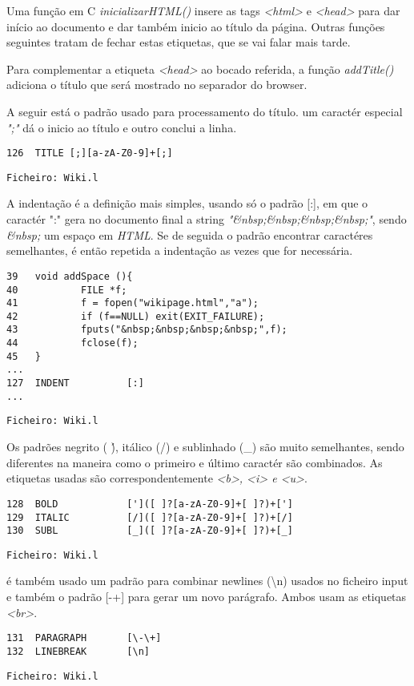\documentclass[11pt,a4paper]{report}
\begin{document}
Uma função em C \emph{inicializarHTML()} insere as tags \emph{<html>} e \emph{<head>} para dar início ao documento e dar também inicio ao título da página. Outras funções seguintes tratam de fechar estas etiquetas, que se vai falar mais tarde.

Para complementar a etiqueta \emph{<head>} ao bocado referida, a função \emph{addTitle()} adiciona o título que será mostrado no separador do browser.

A seguir está o padrão usado para processamento do título. um caractér especial \emph{";"} dá o inicio ao título e outro conclui a linha.


\begin{verbatim}
126  TITLE [;][a-zA-Z0-9]+[;]
\end{verbatim}
\begin{flushright}
\texttt{Ficheiro: Wiki.l}
\end{flushright}


A indentação é a definição mais simples, usando só o padrão [:], em que o caractér ":" gera no documento final a string \emph{"\&nbsp;\&nbsp;\&nbsp;\&nbsp;"}, sendo \emph{\&nbsp;} um espaço em \emph{HTML}. Se de seguida o padrão encontrar caractéres semelhantes, é então repetida a indentação as vezes que for necessária.

\begin{verbatim}
39   void addSpace (){
40           FILE *f;
41           f = fopen("wikipage.html","a");
42           if (f==NULL) exit(EXIT_FAILURE);
43           fputs("&nbsp;&nbsp;&nbsp;&nbsp;",f);
44           fclose(f);
45   }
...
127  INDENT          [:]
...
\end{verbatim}
\begin{flushright}
\texttt{Ficheiro: Wiki.l}
\end{flushright}
\pagebreak
Os padrões negrito ( \' ), itálico (/) e sublinhado (\_) são muito semelhantes, sendo diferentes na maneira como o primeiro e último caractér são combinados. As etiquetas usadas são correspondentemente \emph{<b>, <i> e <u>}.
\begin{verbatim}
128  BOLD            [']([ ]?[a-zA-Z0-9]+[ ]?)+[']
129  ITALIC          [/]([ ]?[a-zA-Z0-9]+[ ]?)+[/]
130  SUBL            [_]([ ]?[a-zA-Z0-9]+[ ]?)+[_]
\end{verbatim}
\begin{flushright}
\texttt{Ficheiro: Wiki.l}
\end{flushright}


é também usado um padrão para combinar newlines (\textbackslash n) usados no ficheiro input e também o padrão [-+] para gerar um novo parágrafo. Ambos usam as etiquetas \emph{<br>}.
\begin{verbatim}
131  PARAGRAPH       [\-\+]
132  LINEBREAK       [\n]
\end{verbatim}
\begin{flushright}
\texttt{Ficheiro: Wiki.l}
\end{flushright}
\end{document}
